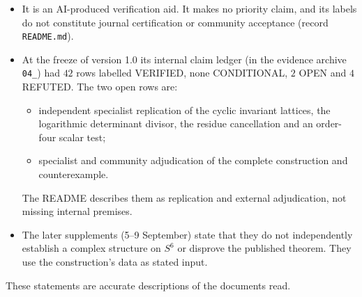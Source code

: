 \begin{itemize}
\item It is an AI-produced verification aid. It makes no priority claim, and its labels do not constitute journal certification or community acceptance (record \texttt{README.md}).
\item At the freeze of version 1.0 its internal claim ledger (in the evidence archive \texttt{04\_}) had $42$ rows labelled \textsf{VERIFIED}, none \textsf{CONDITIONAL}, $2$ \textsf{OPEN} and $4$ \textsf{REFUTED}. The two open rows are:
\begin{itemize}
\item independent specialist replication of the cyclic invariant lattices, the logarithmic determinant divisor, the residue cancellation and an order-four scalar test;
\item specialist and community adjudication of the complete construction and counterexample.
\end{itemize}
The README describes them as replication and external adjudication, not missing internal premises.
\item The later supplements (5--9 September) state that they do not independently establish a complex structure on $S^6$ or disprove the published theorem. They use the construction's data as stated input.
\end{itemize}
These statements are accurate descriptions of the documents read.
